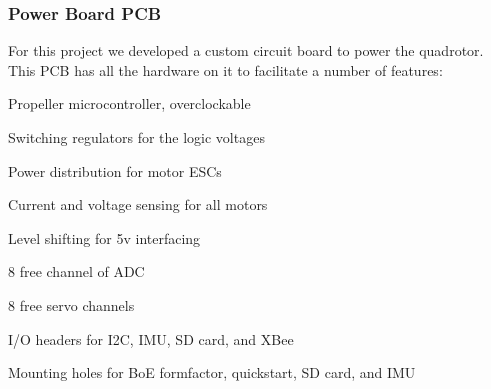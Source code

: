 \documentclass{article}
\numberwithin{equation}{section} %
\begin{document}
\newpage
\subsubsection{Power Board PCB}
For this project we developed a custom circuit board to power the quadrotor. This PCB has all the hardware on it to facilitate a number of features:
\begin{list}{*}{}
	\item Propeller microcontroller, overclockable
	\item Switching regulators for the logic voltages
	\item Power distribution for motor ESCs
	\item Current and voltage sensing for all motors
	\item Level shifting for 5v interfacing
	\item 8 free channel of ADC
	\item 8 free servo channels
	\item I/O headers for I2C, IMU, SD card, and XBee
	\item Mounting holes for BoE formfactor, quickstart, SD card, and IMU
\end{list}
\end{document}

